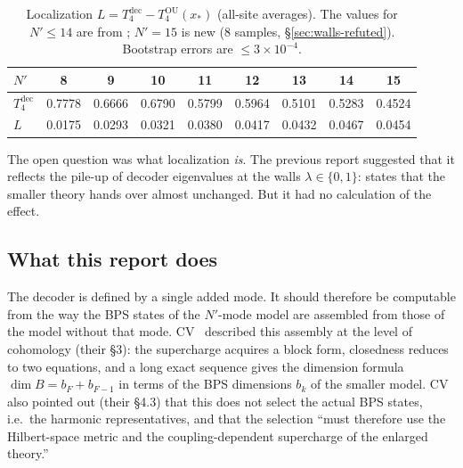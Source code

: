 \documentclass[11pt]{article}
\newcommand{\Np}{N'}
\newcommand{\dec}{\mathrm{dec}}
\newcommand{\OU}{\mathrm{OU}}
\theoremstyle{plain}
\theoremstyle{remark}
\numberwithin{equation}{section}
\begin{document}
\begin{table}[ht]
\centering\small
\caption{Localization $L=T_4^\dec-T_4^\OU(x_*)$ (all-site averages). The values for $\Np\le14$ are from
\cite{prog1005}; $\Np=15$ is new (8 samples, \S\ref{sec:walls-refuted}). Bootstrap errors are $\le3\times10^{-4}$.}
\label{tab:L}
\begin{tabular}{lcccccccc}\toprule
$\Np$ & 8 & 9 & 10 & 11 & 12 & 13 & 14 & 15\\\midrule
$T_4^\dec$ & 0.7778 & 0.6666 & 0.6790 & 0.5799 & 0.5964 & 0.5101 & 0.5283 & 0.4524\\
$L$ & 0.0175 & 0.0293 & 0.0321 & 0.0380 & 0.0417 & 0.0432 & 0.0467 & 0.0454\\\bottomrule
\end{tabular}
\end{table}

The open question was what localization \emph{is}. The previous report suggested that it reflects the pile-up of decoder
eigenvalues at the walls $\lambda\in\{0,1\}$: states that the smaller theory hands over almost unchanged. But it had no
calculation of the effect.

\subsection{What this report does}

The decoder is defined by a single added mode. It should therefore be computable from the way the BPS states of the
$\Np$-mode model are assembled from those of the model without that mode. CV~\cite{CV} described this assembly at the
level of cohomology (their \S3): the supercharge acquires a block form, closedness reduces to two equations, and a long
exact sequence gives the dimension formula $\dim B=b_F+b_{F-1}$ in terms of the BPS dimensions $b_k$ of the smaller
model. CV also pointed out (their \S4.3) that this does not select the actual BPS states, i.e.\ the harmonic
representatives, and that the selection ``must therefore use the Hilbert-space metric and the coupling-dependent
supercharge of the enlarged theory.''
\end{document}
